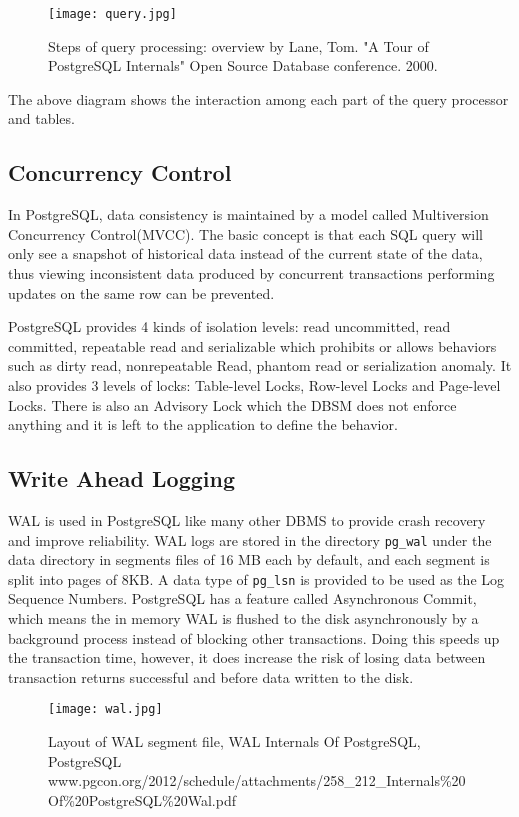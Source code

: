 \documentclass[a4paper]{article}
\begin{document}
\begin{figure}[H]
\centering
\texttt{[image: query.jpg]}
\caption{Steps of query processing: overview by Lane, Tom. "A Tour of PostgreSQL Internals"
Open Source Database conference. 2000.}
\end{figure}

The above diagram shows the interaction among each part of the query processor and tables.

\subsection{Concurrency Control}

In PostgreSQL, data consistency is maintained by a model called Multiversion Concurrency Control(MVCC). The basic concept is that each SQL query will only see a snapshot of historical data instead of the current state of the data, thus viewing inconsistent data produced by concurrent transactions performing updates on the same row can be prevented\cite{1}.

PostgreSQL provides 4 kinds of isolation levels: read uncommitted, read committed, repeatable read and serializable which prohibits or allows behaviors such as dirty read, nonrepeatable Read, phantom read or serialization anomaly. It also provides 3 levels of locks: Table-level Locks, Row-level Locks and Page-level Locks. There is also an Advisory Lock which the DBSM does not enforce anything and it is left to the application to define the behavior\cite{1}.

\subsection{Write Ahead Logging}

WAL is used in PostgreSQL like many other DBMS to provide crash recovery and improve reliability. WAL logs are stored in the directory \texttt{pg\_wal} under the data directory in segments files of 16 MB each by default, and each segment is split into pages of 8KB. A data type of \texttt{pg\_lsn} is provided to be used as the Log Sequence Numbers\cite{1}. PostgreSQL has a feature called Asynchronous Commit, which means the in memory WAL is flushed to the disk asynchronously by a background process instead of blocking other transactions. Doing this speeds up the transaction time, however, it does increase the risk of losing data between transaction returns successful and before data written to the disk\cite{1}.

\begin{figure}[H]
\centering
\texttt{[image: wal.jpg]}
\caption{Layout of WAL segment file, WAL Internals Of PostgreSQL,
PostgreSQL www.pgcon.org/2012/schedule/attachments/258\_212\_Internals\%20Of\%20PostgreSQL\%20Wal.pdf }
\end{figure}
\end{document}
